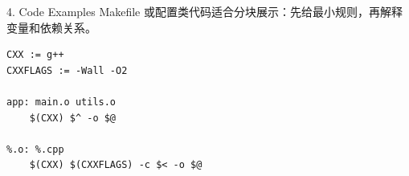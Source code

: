 \documentclass[aspectratio=169,10pt]{beamer}
\begin{document}
\begin{frame}[fragile]{4. Code Examples}
Makefile 或配置类代码适合分块展示：先给最小规则，再解释变量和依赖关系。

\begin{lstlisting}
CXX := g++
CXXFLAGS := -Wall -O2

app: main.o utils.o
    $(CXX) $^ -o $@

%.o: %.cpp
    $(CXX) $(CXXFLAGS) -c $< -o $@
\end{lstlisting}
\end{frame}

\end{document}
